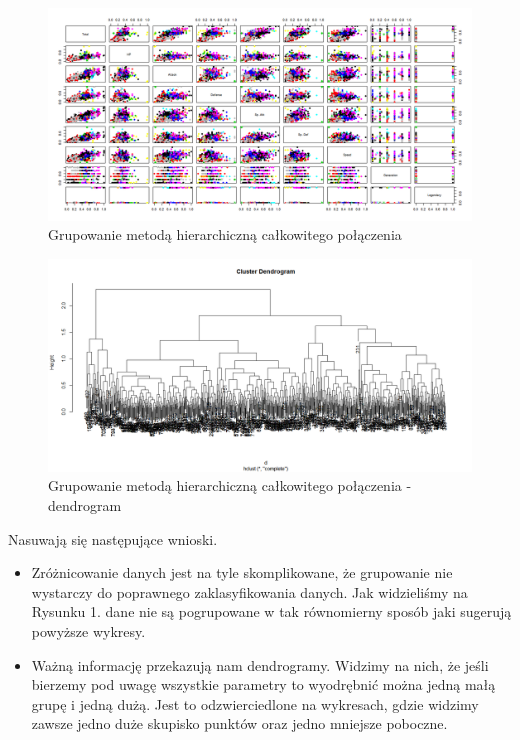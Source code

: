 \documentclass{article}
\begin{document}
\begin{figure}[H]
	\caption{Grupowanie metodą hierarchiczną całkowitego połączenia}
	\begin{center}
	\includegraphics[width=1\columnwidth]{obrazki/graph_complete} %
	\end{center}
\end{figure}
\begin{figure}[H]
	\caption{Grupowanie metodą hierarchiczną całkowitego połączenia - dendrogram}
	\begin{center}
	\includegraphics[width=1\columnwidth]{obrazki/dendrogram_complete} %
	\end{center}
\end{figure}

Nasuwają się następujące wnioski.
\begin{itemize}
	\item Zróżnicowanie danych jest na tyle skomplikowane, że grupowanie nie wystarczy do poprawnego zaklasyfikowania danych. Jak widzieliśmy na Rysunku 1. dane nie są pogrupowane w tak równomierny sposób jaki sugerują powyższe wykresy.
	\item Ważną informację przekazują nam dendrogramy. Widzimy na nich, że jeśli bierzemy pod uwagę wszystkie parametry to wyodrębnić można jedną małą grupę i jedną dużą. Jest to odzwierciedlone na wykresach, gdzie widzimy zawsze jedno duże skupisko punktów oraz jedno mniejsze poboczne.
\end{itemize}
\end{document}
